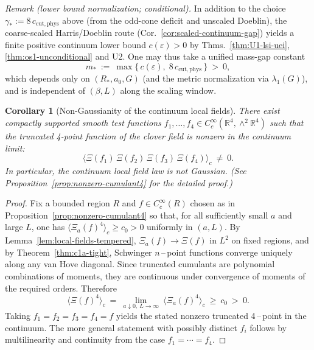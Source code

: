 \documentclass[11pt]{amsart}
\theoremstyle{plain}
\newtheorem{corollary}[theorem]{Corollary}
\theoremstyle{definition}
\theoremstyle{remark}
\begin{document}
\noindent\emph{Remark (lower bound normalization; conditional).} In addition to the choice $\gamma_*:=8\,c_{\mathrm{cut,phys}}$ above (from the odd-cone deficit and unscaled Doeblin), the coarse-scaled Harris/Doeblin route (Cor.~\ref{cor:scaled-continuum-gap}) yields a finite positive continuum lower bound $c(\varepsilon)>0$ by Thms.~\ref{thm:U1-lsi-uei}, \ref{thm:os1-unconditional} and U2. One may thus take a unified mass-gap constant
\[
  m_*\ :=\ \max\{\,c(\varepsilon),\; 8\,c_{\mathrm{cut,phys}}\,\}\ >\ 0,
\]
which depends only on $(R_*,a_0,G)$ (and the metric normalization via $\lambda_1(G)$), and is independent of $(\beta,L)$ along the scaling window.
\begin{corollary}[Non-Gaussianity of the continuum local fields]\label{cor:nonGaussian-main}
There exist compactly supported smooth test functions $f_1,\ldots,f_4\in C_c^\infty(\mathbb R^4,\wedge^2\mathbb R^4)$ such that the truncated 4-point function of the clover field is nonzero in the continuum limit:
\[
  \langle \Xi(f_1)\,\Xi(f_2)\,\Xi(f_3)\,\Xi(f_4)\rangle_c\ \neq\ 0.
\]
In particular, the continuum local field law is not Gaussian. (See Proposition~\ref{prop:nonzero-cumulant4} for the detailed proof.)
\end{corollary}
\begin{proof}
Fix a bounded region $R$ and $f\in C_c^\infty(R)$ chosen as in Proposition~\ref{prop:nonzero-cumulant4} so that, for all sufficiently small $a$ and large $L$, one has $\langle \Xi_a(f)^4\rangle_c\ge c_0>0$ uniformly in $(a,L)$. By Lemma~\ref{lem:local-fields-tempered}, $\Xi_a(f)\to \Xi(f)$ in $L^2$ on fixed regions, and by Theorem~\ref{thm:c1a-tight}, Schwinger $n$\,–\,point functions converge uniquely along any van Hove diagonal. Since truncated cumulants are polynomial combinations of moments, they are continuous under convergence of moments of the required orders. Therefore
\[
  \langle \Xi(f)^4\rangle_c\ =\ \lim_{a\downarrow 0,\ L\to\infty}\ \langle \Xi_a(f)^4\rangle_c\ \ge\ c_0\ >\ 0.
\]
Taking $f_1=f_2=f_3=f_4=f$ yields the stated nonzero truncated 4\,–\,point in the continuum. The more general statement with possibly distinct $f_i$ follows by multilinearity and continuity from the case $f_1=\cdots=f_4$.
\end{proof}
\end{document}
